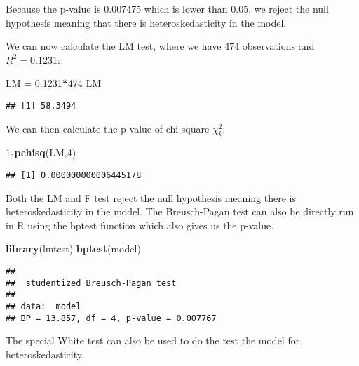 \documentclass[
]{article}
\newenvironment{Shaded}{\begin{snugshade}}{\end{snugshade}}
\newcommand{\DecValTok}[1]{\textcolor[rgb]{0.00,0.00,0.81}{#1}}
\newcommand{\FloatTok}[1]{\textcolor[rgb]{0.00,0.00,0.81}{#1}}
\newcommand{\FunctionTok}[1]{\textcolor[rgb]{0.13,0.29,0.53}{\textbf{#1}}}
\newcommand{\NormalTok}[1]{#1}
\newcommand{\OtherTok}[1]{\textcolor[rgb]{0.56,0.35,0.01}{#1}}
\newcommand{\SpecialCharTok}[1]{\textcolor[rgb]{0.81,0.36,0.00}{\textbf{#1}}}
\begin{document}
Because the p-value is 0.007475 which is lower than 0.05, we reject the
null hypothesis meaning that there is heteroskedasticity in the model.

We can now calculate the LM test, where we have 474 observations and
\(R^2=0.1231\):

\begin{Shaded}
\begin{Highlighting}[]
\NormalTok{LM }\OtherTok{=} \FloatTok{0.1231}\SpecialCharTok{*}\DecValTok{474}
\NormalTok{LM}
\end{Highlighting}
\end{Shaded}

\begin{verbatim}
## [1] 58.3494
\end{verbatim}

We can then calculate the p-value of chi-square \(\chi^2_k\):

\begin{Shaded}
\begin{Highlighting}[]
\DecValTok{1}\SpecialCharTok{{-}}\FunctionTok{pchisq}\NormalTok{(LM,}\DecValTok{4}\NormalTok{)}
\end{Highlighting}
\end{Shaded}

\begin{verbatim}
## [1] 0.000000000006445178
\end{verbatim}

Both the LM and F test reject the null hypothesis meaning there is
heteroskedasticity in the model. The Breusch-Pagan test can also be
directly run in R using the bptest function which also gives us the
p-value.

\begin{Shaded}
\begin{Highlighting}[]
\FunctionTok{library}\NormalTok{(lmtest)}
\FunctionTok{bptest}\NormalTok{(model)}
\end{Highlighting}
\end{Shaded}

\begin{verbatim}
## 
##  studentized Breusch-Pagan test
## 
## data:  model
## BP = 13.857, df = 4, p-value = 0.007767
\end{verbatim}

The special White test can also be used to do the test the model for
heteroskedasticity.
\end{document}
